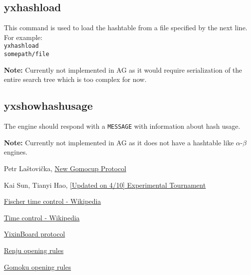 \documentclass[12pt,a4paper]{article}
\begin{document}
\subsection{yxhashload}
This command is used to load the hashtable from a file specified by the next line. For example:
\\
\texttt{yxhashload}\\
\texttt{somepath/file}

\textbf{Note:} Currently not implemented in AG as it would require serialization of the entire search tree which is too complex for now.

\subsection{yxshowhashusage}
The engine should respond with a \texttt{MESSAGE} with information about hash usage.

\textbf{Note:} Currently not implemented in AG as it does not have a hashtable like $\alpha$-$\beta$ engines.



\begin{thebibliography}{99}
Petr Laštovička, \href{http://petr.lastovicka.sweb.cz/protocl2en.htm}{New Gomocup Protocol}

Kai Sun, Tianyi Hao, \href{https://gomocup.org/news/experimental-tournament-update-2020/}{[Updated on 4/10] Experimental Tournament}

\href{https://en.wikipedia.org/wiki/Time_control#Increment_and_delay_methods}{Fischer time control - Wikipedia}

\href{https://en.wikipedia.org/wiki/Time_control#Sudden_death}{Time control - Wikipedia}

\href{https://github.com/accreator/Yixin-protocol/blob/master/protocol.pdf}{YixinBoard protocol}

\href{https://www.renju.net/rule/}{Renju opening rules}

\href{http://gomokuworld.com/gomoku/2}{Gomoku opening rules}

\end{thebibliography}
\end{document}
